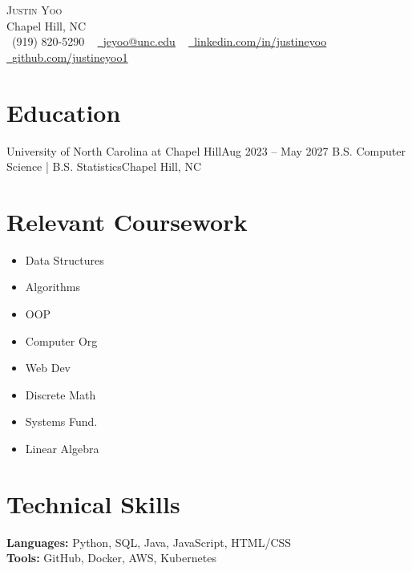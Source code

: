 \begin{center}
    {\Huge \scshape Justin Yoo} \\ \vspace{1pt}
    Chapel Hill, NC \\ \vspace{1pt}
    \small \raisebox{-0.1\height}\faPhone\ (919) 820-5290 ~ 
    \href{mailto:jeyoo@unc.edu}{\raisebox{-0.2\height}\faEnvelope\ \underline{jeyoo@unc.edu}} ~ 
    \href{https://linkedin.com/in/justineyoo}{\raisebox{-0.2\height}\faLinkedin\ \underline{linkedin.com/in/justineyoo}}  ~
    \href{https://github.com/justineyoo1}{\raisebox{-0.2\height}\faGithub\ \underline{github.com/justineyoo1}}
    \vspace{-8pt}
\end{center}

\section{Education}
  \resumeSubHeadingListStart
    \resumeSubheading
      {University of North Carolina at Chapel Hill}{Aug 2023 -- May 2027}
      {B.S. Computer Science | B.S. Statistics}{Chapel Hill, NC}
  \resumeSubHeadingListEnd

\section{Relevant Coursework}
\begin{multicols}{4}
  \begin{itemize}[itemsep=-4pt]
    \item Data Structures
    \item Algorithms
    \item OOP
    \item Computer Org
    \item Web Dev
    \item Discrete Math
    \item Systems Fund.
    \item Linear Algebra
  \end{itemize}
\end{multicols}

\section{Technical Skills}
 \begin{itemize}[leftmargin=0.15in, label={}]
    \small{\item{
     \textbf{Languages:} Python, SQL, Java, JavaScript, HTML/CSS \\
     \textbf{Tools:} GitHub, Docker, AWS, Kubernetes
    }}
 \end{itemize}

